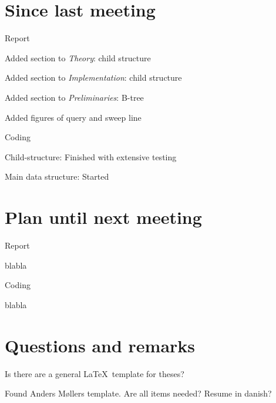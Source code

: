\documentclass[a4paper,11pt,agenda,chair]{meetingmins}
\begin{document}
\maketitle

\section{Since last meeting}
\begin{items}
\item Report
	\begin{items}
		\item Added section to \textit{Theory}: child structure
		\item Added section to \textit{Implementation}: child structure
        \item Added section to \textit{Preliminaries}: B-tree
        \item Added figures of query and sweep line
	\end{items}
\item Coding
	\begin{items}
		\item Child-structure: Finished with extensive testing
		\item Main data structure: Started
	\end{items}
\end{items}

\section{Plan until next meeting}
\begin{items}
\item Report
	\begin{items}
		\item blabla
	\end{items}
\item Coding
	\begin{items}
		\item blabla
	\end{items}
\end{items}

\section{Questions and remarks}
\begin{items}
	\item Is there are a general \LaTeX~template for theses?
		\begin{items}
			\item Found Anders M\o llers template. Are all items needed? Resume in danish?
		\end{items}
\end{items}
\end{document}
